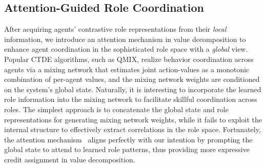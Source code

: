 \documentclass{article} %
\begin{document}
\subsection{Attention-Guided Role Coordination}\label{sec:attention}
After acquiring agents' contrastive role representations from their \textit{local} information, we introduce an attention mechanism in value decomposition to enhance agent coordination in the sophisticated role space with a \textit{global} view.
Popular CTDE algorithms, such as QMIX, realize behavior coordination across agents via a mixing network that estimates joint action-values as a monotonic combination of per-agent values, and the mixing network weights are conditioned on the system's global state.
Naturally, it is interesting to incorporate the learned role information into the mixing network to facilitate skillful coordination across roles.
The simplest approach is to concatenate the global state and role representations for generating mixing network weights, while it fails to exploit the internal structure to effectively extract correlations in the role space.
Fortunately, the attention mechanism~\citep{vaswani2017attention} aligns perfectly with our intention by prompting the global state to attend to learned role patterns, thus providing more expressive credit assignment in value decomposition.
\end{document}
